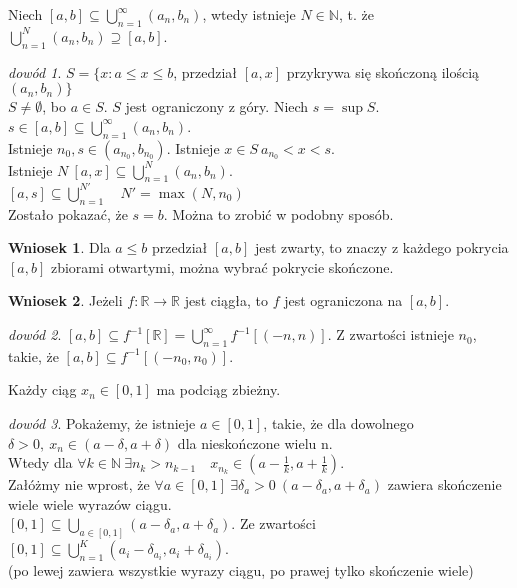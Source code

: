 \documentclass[twoside,10pt]{article}
\theoremstyle{definition}
\theoremstyle{definition}
\theoremstyle{definition}
\theoremstyle{definition}
\theoremstyle{remark}
\newtheorem*{dd}{dowód}
\theoremstyle{definition}
\theoremstyle{definition}
\newtheorem*{wn}{Wniosek}
\theoremstyle{definition}
\theoremstyle{definition}
\theoremstyle{definition}
\theoremstyle{definition}
\begin{document}
\begin{lem}
    Niech $[a,b] \subseteq \bigcup\limits_{n=1}^\infty (a_n,b_n)$, wtedy istnieje $N \in \mathbb{N}$, t. że $\bigcup\limits_{n=1}^N (a_n,b_n) \supseteq [a,b]$.
    \begin{dd}
        $S = \{ x: a \le x \le b$, przedział $[a,x]$ przykrywa się skończoną ilością $(a_n,b_n)\}$ \\
        $S \neq \emptyset$, bo $a \in S$. $S$ jest ograniczony z góry. Niech $s = \sup S$. \\
        $ s \in [a,b] \subseteq \bigcup\limits_{n=1}^\infty (a_n,b_n)$. \\
        Istnieje $n_0, s \in (a_{n_0},b_{n_0})$. Istnieje $x \in S \ a_{n_0} < x < s $. \\
        Istnieje $N \ [a,x] \subseteq \bigcup\limits_{n=1}^N (a_n,b_n).$ \\
        $[a,s] \subseteq \bigcup\limits_{n=1}^{N'} \quad N' = \max(N,n_0)$ \\
        Zostało pokazać, że $s = b$. Można to zrobić w podobny sposób.
    \end{dd}
\end{lem}

\begin{wn}
    Dla $a \le b$ przedział $[a,b]$ jest zwarty, to znaczy z każdego pokrycia $[a,b]$ zbiorami otwartymi, 
    można wybrać pokrycie skończone.
\end{wn}

\begin{wn}
    Jeżeli $f: \mathbb{R} \rightarrow \mathbb{R}$ jest ciągła, to $f$ jest ograniczona na $[a,b]$.
\end{wn}
\begin{dd} 
    $[a,b] \subseteq f^{-1}[\mathbb{R}]  = \bigcup\limits_{n=1}^\infty f^{-1}[(-n,n)]$. 
    Z zwartości istnieje $n_0$, takie, że $[a,b] \subseteq f^{-1}[(-n_0,n_0)]$.
\end{dd} 

\begin{tw} 
    Każdy ciąg $x_n \in [0,1]$ ma podciąg zbieżny. 
\end{tw} 
\begin{dd} 
    Pokażemy, że istnieje $a \in [0,1]$, takie, że dla dowolnego 
    $\delta > 0, \ x_n \in (a-\delta,a+\delta)$ dla nieskończone wielu n. \\
    Wtedy dla $\forall k \in \mathbb{N} \ \exists n_k > n_{k-1} \quad x_{n_k} \in (a-\frac{1}{k},a+\frac{1}{k}).$ \\ 
    Załóżmy nie wprost, że $\forall a \in [0,1] \ \exists \delta_a > 0 \ (a-\delta_a,a+\delta_a)$ 
    zawiera skończenie wiele wiele wyrazów ciągu. \\
    $[0,1] \subseteq \bigcup\limits_{a \in [0,1]} (a-\delta_a,a+\delta_a) $. 
    Ze zwartości $[0,1] \subseteq \bigcup\limits_{n=1}^K (a_i-\delta_{a_i},a_i+\delta_{a_i}) $. \lightning \\ 
    (po lewej zawiera wszystkie wyrazy ciągu, po prawej tylko skończenie wiele)
\end{dd}
\end{document}
